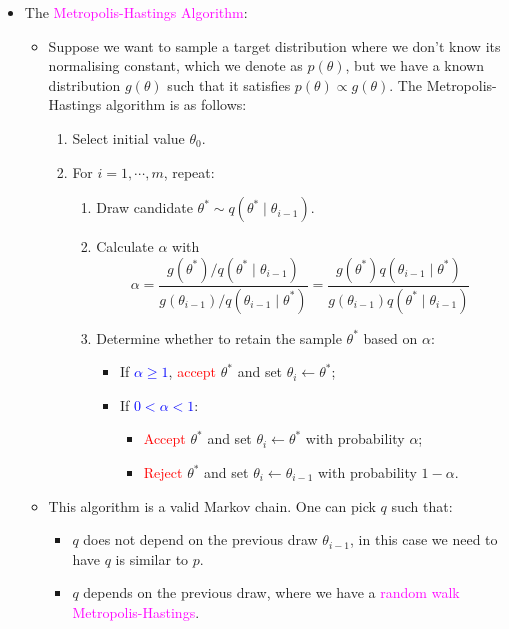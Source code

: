 \documentclass[UTF8]{book}
\newcommand{\concept}[1]{\textcolor{magenta}{#1}}
\newcommand{\highlight}[1]{\textcolor{red}{#1}}
\renewcommand{\emph}[1]{\textcolor{blue}{#1}}
\begin{document}
\begin{itemize}
\item The \concept{Metropolis-Hastings Algorithm}:
\begin{itemize}
	\item Suppose we want to sample a target distribution where we don't know its normalising constant, which we denote as $p(\theta)$, but we have a known distribution $g(\theta)$ such that it satisfies $p(\theta)\propto g(\theta)$. The Metropolis-Hastings algorithm is as follows:
\begin{enumerate}
	\item Select initial value $\theta_0$.
	\item For $i=1,\cdots,m$, repeat:
	\begin{enumerate}
		\item Draw candidate $\theta^*\sim q(\theta^*\mid\theta_{i-1})$.
		\item Calculate $\alpha$ with
		$$
			\alpha = \dfrac{g(\theta^*)/q(\theta^*\mid\theta_{i-1})}{g(\theta_{i-1})/q(\theta_{i-1}\mid\theta^*)} = \dfrac{g(\theta^*)q(\theta_{i-1}\mid \theta^*)}{g(\theta_{i-1})q(\theta^*\mid\theta_{i-1})}
		$$
		\item Determine whether to retain the sample $\theta^*$ based on $\alpha$:
		\begin{itemize}
			\item If \emph{$\alpha\geq 1$}, \highlight{accept} $\theta^*$ and set $\theta_i\leftarrow\theta^*$;
			\item If \emph{$0<\alpha<1$}:
			\begin{itemize}
				\item \highlight{Accept} $\theta^*$ and set $\theta_i\leftarrow\theta^*$ with probability $\alpha$;
				\item \highlight{Reject} $\theta^*$ and set $\theta_i\leftarrow\theta_{i-1}$ with probability $1-\alpha$.
			\end{itemize}
		\end{itemize}
\end{enumerate}		
\end{enumerate}
	\item This algorithm is a valid Markov chain. One can pick $q$ such that:
	\begin{itemize}
		\item $q$ does not depend on the previous draw $\theta_{i-1}$, in this case we need to have $q$ is similar to $p$.
		\item $q$ depends on the previous draw, where we have a \concept{random walk Metropolis-Hastings}.

\end{itemize}
\end{itemize}
\end{itemize}
\end{document}
